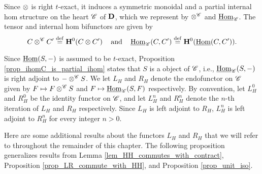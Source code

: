Since $\otimes$ is right $t$-exact, it induces a symmetric 
monoidal and a partial internal hom structure on the heart 
$\mathscr{C}$ of $\mathbf{D}$, which we represent by $\otimes^{\mathscr{C}}$ 
and $\underline{\mathrm{Hom}}_{\mathscr{C}}$. The tensor and internal hom bifunctors
are given by
\[
C \otimes^{\mathscr{C}} C' \stackrel{\mathrm{def}}{=} \mathbf{H}^0(C \otimes C') 
   \;\;\;\textrm{ and }\;\;\;
\underline{\mathrm{Hom}}_{\mathscr{C}}(C, C') \stackrel{\mathrm{def}}{=} \mathbf{H}^0(\underline{\mathrm{Hom}}(C, C')).
\]

Since $\underline{\mathrm{Hom}}(S, -)$ is assumed to be $t$-exact, Proposition 
\ref{prop_ihomC_is_partial_ihom} states that $S$ is a \SemiInvertible
object of $\mathscr{C}$, i.e., $\underline{\mathrm{Hom}}_{\mathscr{C}}(S, -)$ is right
adjoint to $- \otimes^{\mathscr{C}} S$. We let $L_H$ and $R_H$ denote 
the endofunctor on $\mathscr{C}$ given by $F \mapsto F 
\otimes^{\mathscr{C}} S$ and $F \mapsto \underline{\mathrm{Hom}}_{\mathscr{C}}(S, F)$ 
respectively. By convention, let $L_H^0$ and $R_H^0$ be the 
identity functor on $\mathscr{C}$, and let $L_H^n$ and $R_H^n$ denote 
the $n$-th iteration of $L_H$ and $R_H$ respectively. Since $L_H$ 
is left adjoint to $R_H$, $L_H^n$ is left adjoint to $R_H^n$ for
every integer $n > 0$.

Here are some additional results about the functors $L_H$ and 
$R_H$ that we will refer to throughout the remainder of this 
chapter. The following proposition generalizes results from
Lemma \ref{lem_HH_commutes_with_contract}, Proposition 
\ref{prop_LR_commute_with_HH}, and Proposition 
\ref{prop_unit_iso}.


